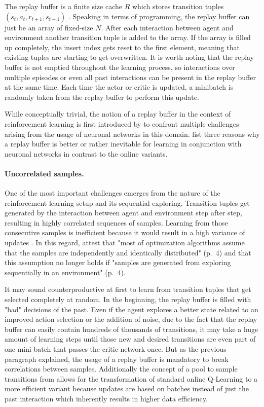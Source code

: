 The replay buffer is a finite size cache $R$ which stores transition tuples $(s_t, a_t, r_{t+1},s_{t+1})$ \cite[p.~4]{mnih2013playing}. Speaking in terms of programming, the replay buffer can just be an array of fixed-size $N$. After each interaction between agent and environment another transition tuple is added to the array. If the array is filled up completely, the insert index gets reset to the first element, meaning that existing tuples are starting to get overwritten. It is worth noting that the replay buffer is not emptied throughout the learning process, so interactions over multiple episodes or even all past interactions can be present in the replay buffer at the same time. Each time the actor or critic is updated, a minibatch is randomly taken from the replay buffer to perform this update.
\par 
While conceptually trivial, the notion of a replay buffer in the context of reinforcement learning is first introduced by \cite{lin1992reinforcement} to confront multiple challenges arising from the usage of neuronal networks in this domain. \cite{mnih2013playing} list three reasons why a replay buffer is better or rather inevitable for learning in conjunction with neuronal networks in contrast to  the online variants.
\paragraph{Uncorrelated samples.} One of the most important  challenges emerges from the nature of the reinforcement learning setup and its sequential exploring.  Transition tuples get generated by the interaction between agent and environment step after step, resulting in highly correlated sequences of samples. Learning from those consecutive samples is inefficient because it would result in a high variance of updates \cite[p.~5]{mnih2013playing}. In this regard, \cite{lillicrap2019continuous} attest that "most of optimization algorithms assume that the samples are independently and identically distributed" (p.~4) and that this assumption no longer holds if "samples are generated from exploring sequentially in an environment" (p.~4).
\par
It may sound counterproductive at first to learn from transition tuples that get selected completely at random. In the beginning, the replay buffer is filled with "bad" decisions of the past. Even if the agent explores a better state related to an improved action selection or the addition of noise, due to the fact that the replay buffer can easily contain hundreds of thousands of transitions, it may take a huge amount of learning steps until those new and desired transitions are even part of one mini-batch that passes the critic network once. But as the previous paragraph explained, the usage of a replay buffer is mandatory to break correlations between samples. Additionally the concept of a pool to sample transitions from allows for the transformation of standard online Q-Learning to a more efficient variant because updates are based on batches instead of just the past interaction which inherently results in higher data efficiency.

